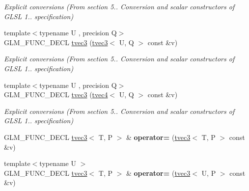 \begin{DoxyCompactItemize}
\begin{DoxyCompactList}\small\item\em Explicit conversions (From section 5.. Conversion and scalar constructors of G\-L\-S\-L 1.. specification) \end{DoxyCompactList}\item 
\hypertarget{structglm_1_1detail_1_1tvec3_a54b078bacee2ec2449d2739d98f20ca4}{{\footnotesize template$<$typename U , precision Q$>$ }\\G\-L\-M\-\_\-\-F\-U\-N\-C\-\_\-\-D\-E\-C\-L \hyperlink{structglm_1_1detail_1_1tvec3_a54b078bacee2ec2449d2739d98f20ca4}{tvec3} (\hyperlink{structglm_1_1detail_1_1tvec3}{tvec3}$<$ U, Q $>$ const \&v)}\label{structglm_1_1detail_1_1tvec3_a54b078bacee2ec2449d2739d98f20ca4}

\begin{DoxyCompactList}\small\item\em Explicit conversions (From section 5.. Conversion and scalar constructors of G\-L\-S\-L 1.. specification) \end{DoxyCompactList}\item 
\hypertarget{structglm_1_1detail_1_1tvec3_aee034f5d37843761ab03ce2c279a0435}{{\footnotesize template$<$typename U , precision Q$>$ }\\G\-L\-M\-\_\-\-F\-U\-N\-C\-\_\-\-D\-E\-C\-L \hyperlink{structglm_1_1detail_1_1tvec3_aee034f5d37843761ab03ce2c279a0435}{tvec3} (\hyperlink{structglm_1_1detail_1_1tvec4}{tvec4}$<$ U, Q $>$ const \&v)}\label{structglm_1_1detail_1_1tvec3_aee034f5d37843761ab03ce2c279a0435}

\begin{DoxyCompactList}\small\item\em Explicit conversions (From section 5.. Conversion and scalar constructors of G\-L\-S\-L 1.. specification) \end{DoxyCompactList}\item 
\hypertarget{structglm_1_1detail_1_1tvec3_a9f44bd2cac6579b51eab334829af1421}{G\-L\-M\-\_\-\-F\-U\-N\-C\-\_\-\-D\-E\-C\-L \hyperlink{structglm_1_1detail_1_1tvec3}{tvec3}$<$ T, P $>$ \& {\bfseries operator=} (\hyperlink{structglm_1_1detail_1_1tvec3}{tvec3}$<$ T, P $>$ const \&v)}\label{structglm_1_1detail_1_1tvec3_a9f44bd2cac6579b51eab334829af1421}

\item 
\hypertarget{structglm_1_1detail_1_1tvec3_aa930edd4c5010f088ff8bf10d3a50378}{{\footnotesize template$<$typename U $>$ }\\G\-L\-M\-\_\-\-F\-U\-N\-C\-\_\-\-D\-E\-C\-L \hyperlink{structglm_1_1detail_1_1tvec3}{tvec3}$<$ T, P $>$ \& {\bfseries operator=} (\hyperlink{structglm_1_1detail_1_1tvec3}{tvec3}$<$ U, P $>$ const \&v)}\label{structglm_1_1detail_1_1tvec3_aa930edd4c5010f088ff8bf10d3a50378}


\end{DoxyCompactItemize}
